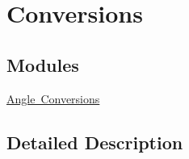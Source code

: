 \hypertarget{group___e_g_x_math-_conversions}{}\section{Conversions}
\label{group___e_g_x_math-_conversions}
\subsection*{Modules}
\begin{DoxyCompactItemize}
\item 
\mbox{\hyperlink{group___e_g_x_math-_angle_conversions}{Angle Conversions}}
\end{DoxyCompactItemize}


\subsection{Detailed Description}

